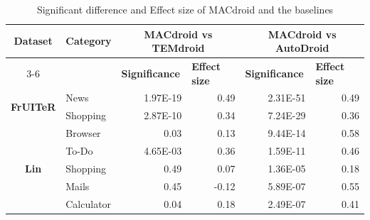 \begin{table}[htbp]
  \centering
  \caption{Significant difference and Effect size of MACdroid and the baselines}
    \begin{tabular}{c|l|r|r|r|r}
    \toprule
    \multirow{2}[4]{*}{\textbf{Dataset}} & \multicolumn{1}{c|}{\multirow{2}[4]{*}{\textbf{Category}}} & \multicolumn{2}{c|}{\textbf{MACdroid vs TEMdroid}} & \multicolumn{2}{c}{\textbf{MACdroid vs AutoDroid}} \\
\cmidrule{3-6}          &       & \multicolumn{1}{l|}{\textbf{Significance}} & \multicolumn{1}{l|}{\textbf{Effect size}} & \multicolumn{1}{l|}{\textbf{Significance}} & \multicolumn{1}{l}{\textbf{Effect size}} \\
    \midrule
    \multirow{2}[2]{*}{\textbf{FrUITeR}} & News  & \textcolor[rgb]{ 1,  0,  0}{1.97E-19} & \textcolor[rgb]{ 1,  0,  0}{0.49} & \textcolor[rgb]{ 1,  0,  0}{2.31E-51} & \textcolor[rgb]{ 1,  0,  0}{0.49} \\
          & Shopping & \textcolor[rgb]{ 1,  0,  0}{2.87E-10} & \textcolor[rgb]{ 1,  0,  0}{0.34} & \textcolor[rgb]{ 1,  0,  0}{7.24E-29} & \textcolor[rgb]{ 1,  0,  0}{0.36} \\
    \midrule
    \multirow{5}[2]{*}{\textbf{Lin}} & Browser & \textcolor[rgb]{ 1,  0,  0}{0.03} & 0.13  & \textcolor[rgb]{ 1,  0,  0}{9.44E-14} & \textcolor[rgb]{ 1,  0,  0}{0.58} \\
          & To-Do & \textcolor[rgb]{ 1,  0,  0}{4.65E-03} & \textcolor[rgb]{ 1,  0,  0}{0.36} & \textcolor[rgb]{ 1,  0,  0}{1.59E-11} & \textcolor[rgb]{ 1,  0,  0}{0.46} \\
          & Shopping & 0.49  & 0.07  & \textcolor[rgb]{ 1,  0,  0}{1.36E-05} & 0.18 \\
          & Mails & 0.45  & -0.12 & \textcolor[rgb]{ 1,  0,  0}{5.89E-07} & \textcolor[rgb]{ 1,  0,  0}{0.55} \\
          & Calculator & \textcolor[rgb]{ 1,  0,  0}{0.04} & 0.18  & \textcolor[rgb]{ 1,  0,  0}{2.49E-07} & \textcolor[rgb]{ 1,  0,  0}{0.41} \\
    \bottomrule
    \end{tabular}%
  \label{tab:significant}%
\end{table}%





